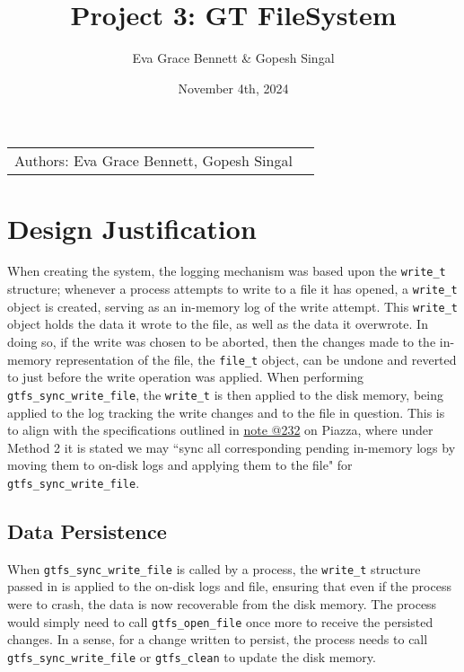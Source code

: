 \documentclass{article}
\title{Project 3: GT FileSystem
}
\author{Eva Grace Bennett \& Gopesh Singal}
\date{November 4th, 2024}
\begin{document}
\maketitle

\noindent\begin{tabular}{@{}ll}
    Authors: Eva Grace Bennett, Gopesh Singal
\end{tabular}

\section*{Design Justification}
When creating the system, the logging mechanism was based upon the \texttt{write\_t} structure; whenever a process attempts to write to a file it has opened, a \texttt{write\_t} object is created, serving as an in-memory log of the write attempt. This \texttt{write\_t} object holds the data it wrote to the file, as well as the data it overwrote. In doing so, if the write was chosen to be aborted, then the changes made to the in-memory representation of the file, the \texttt{file\_t} object, can be undone and reverted to just before the write operation was applied. When performing \texttt{gtfs\_sync\_write\_file}, the \texttt{write\_t} is then applied to the disk memory, being applied to the log tracking the write changes and to the file in question. This is to align with the specifications outlined in \href{https://piazza.com/class/m00d9edry1e5xc/post/232}{note @232} on Piazza, where under Method 2 it is stated we may ``sync all corresponding pending in-memory logs by moving them to on-disk logs and applying them to the file" for \texttt{gtfs\_sync\_write\_file}.
\subsection*{Data Persistence}
When \texttt{gtfs\_sync\_write\_file} is called by a process, the \texttt{write\_t} structure passed in is applied to the on-disk logs and file, ensuring that even if the process were to crash, the data is now recoverable from the disk memory. The process would simply need to call \texttt{gtfs\_open\_file} once more to receive the persisted changes. In a sense, for a change written to persist, the process needs to call \texttt{gtfs\_sync\_write\_file} or \texttt{gtfs\_clean} to update the disk memory. 
\end{document}
